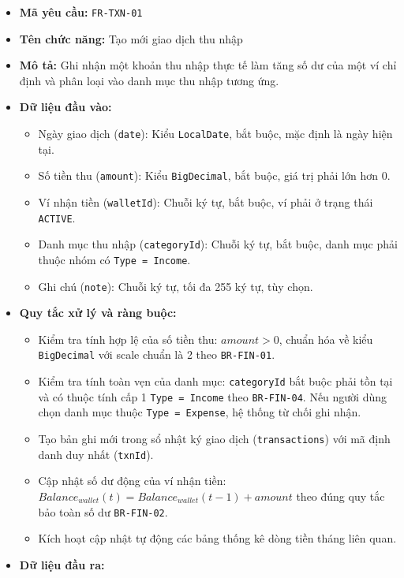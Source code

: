\documentclass[11pt,a4paper]{article}
\providecommand{\tightlist}{
  \setlength{\itemsep}{0pt}\setlength{\parskip}{0pt}}
\begin{document}
\begin{itemize}
\tightlist
\item
  \textbf{Mã yêu cầu:} \texttt{FR-TXN-01}
\item
  \textbf{Tên chức năng:} Tạo mới giao dịch thu nhập
\item
  \textbf{Mô tả:} Ghi nhận một khoản thu nhập thực tế làm tăng số dư của
  một ví chỉ định và phân loại vào danh mục thu nhập tương ứng.
\item
  \textbf{Dữ liệu đầu vào:}

  \begin{itemize}
  \tightlist
  \item
    Ngày giao dịch (\texttt{date}): Kiểu \texttt{LocalDate}, bắt buộc,
    mặc định là ngày hiện tại.
  \item
    Số tiền thu (\texttt{amount}): Kiểu \texttt{BigDecimal}, bắt buộc,
    giá trị phải lớn hơn 0.
  \item
    Ví nhận tiền (\texttt{walletId}): Chuỗi ký tự, bắt buộc, ví phải ở
    trạng thái \texttt{ACTIVE}.
  \item
    Danh mục thu nhập (\texttt{categoryId}): Chuỗi ký tự, bắt buộc, danh
    mục phải thuộc nhóm có \texttt{Type\ =\ Income}.
  \item
    Ghi chú (\texttt{note}): Chuỗi ký tự, tối đa 255 ký tự, tùy chọn.
  \end{itemize}
\item
  \textbf{Quy tắc xử lý và ràng buộc:}

  \begin{itemize}
  \tightlist
  \item
    Kiểm tra tính hợp lệ của số tiền thu: \(amount > 0\), chuẩn hóa về
    kiểu \texttt{BigDecimal} với scale chuẩn là 2 theo
    \texttt{BR-FIN-01}.
  \item
    Kiểm tra tính toàn vẹn của danh mục: \texttt{categoryId} bắt buộc
    phải tồn tại và có thuộc tính cấp 1 \texttt{Type\ =\ Income} theo
    \texttt{BR-FIN-04}. Nếu người dùng chọn danh mục thuộc
    \texttt{Type\ =\ Expense}, hệ thống từ chối ghi nhận.
  \item
    Tạo bản ghi mới trong sổ nhật ký giao dịch (\texttt{transactions})
    với mã định danh duy nhất (\texttt{txnId}).
  \item
    Cập nhật số dư động của ví nhận tiền:
    \(Balance_{wallet}(t) = Balance_{wallet}(t-1) + amount\) theo đúng
    quy tắc bảo toàn số dư \texttt{BR-FIN-02}.
  \item
    Kích hoạt cập nhật tự động các bảng thống kê dòng tiền tháng liên
    quan.
  \end{itemize}
\item
  \textbf{Dữ liệu đầu ra:}


\end{itemize}
\end{document}
